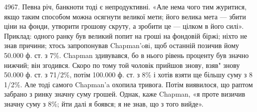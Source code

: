 4967. Певна річ, банкноти тоді є непродуктивні. «Але нема чого тим
журитися, якщо таким способом можна осягнути великої мети; його велика
мета — збити ціни на фонди, утворити грошову скруту, а зробити це — цілком
в його силі». Приклад: одного ранку був великий попит на гроші на фондовій
біржі; ніхто не знав причини; хтось запропонував Chapman’oвi, щоб останній
позичив йому 50.000 ф. ст. з 7\%. Chapman здивувався, бо в нього рівень
проценту був значно нижчий; він згодився. Скоро по тому той чоловік прийшов
знову, взяв" знову 50.000 ф. ст. з 71/2\%, потім 100.000 ф. ст. з 8\% і хотів
взяти ще більшу суму з 8 1/2\%. Але тоді самого Chapman’a охопила тривога.
Потім виявилося, що раптом забрано з ринку значну суму грошей. Однак, каже
Chapman, «я проте визичив значну суму з 8\%; йти далі я боявся; я не знав,
що з того вийде».
